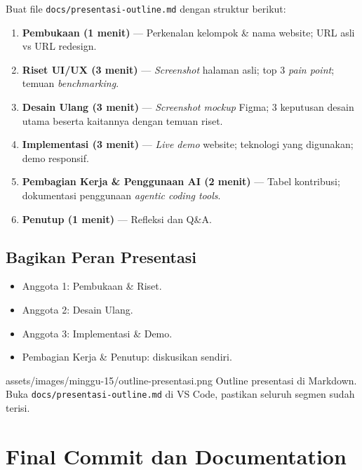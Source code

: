 Buat file \texttt{docs/presentasi-outline.md} dengan struktur berikut:
\begin{enumerate}
  \item \textbf{Pembukaan (1 menit)} --- Perkenalan kelompok \& nama website; URL asli vs URL redesign.
  \item \textbf{Riset UI/UX (3 menit)} --- \emph{Screenshot} halaman asli; top 3 \emph{pain point}; temuan \emph{benchmarking}.
  \item \textbf{Desain Ulang (3 menit)} --- \emph{Screenshot mockup} Figma; 3 keputusan desain utama beserta kaitannya dengan temuan riset.
  \item \textbf{Implementasi (3 menit)} --- \emph{Live demo} website; teknologi yang digunakan; demo responsif.
  \item \textbf{Pembagian Kerja \& Penggunaan AI (2 menit)} --- Tabel kontribusi; dokumentasi penggunaan \emph{agentic coding tools}.
  \item \textbf{Penutup (1 menit)} --- Refleksi dan Q\&A.
\end{enumerate}

\subsection{Bagikan Peran Presentasi}
\label{subsec:peran-presentasi}

\begin{itemize}
  \item Anggota 1: Pembukaan \& Riset.
  \item Anggota 2: Desain Ulang.
  \item Anggota 3: Implementasi \& Demo.
  \item Pembagian Kerja \& Penutup: diskusikan sendiri.
\end{itemize}

\begin{tangkapanlayar}
  {assets/images/minggu-15/outline-presentasi.png}
  {Outline presentasi di Markdown.}
  {Buka \texttt{docs/presentasi-outline.md} di VS Code, pastikan seluruh segmen sudah terisi.}
\end{tangkapanlayar}

\section{Final Commit dan Documentation}
\label{sec:final-commit}

